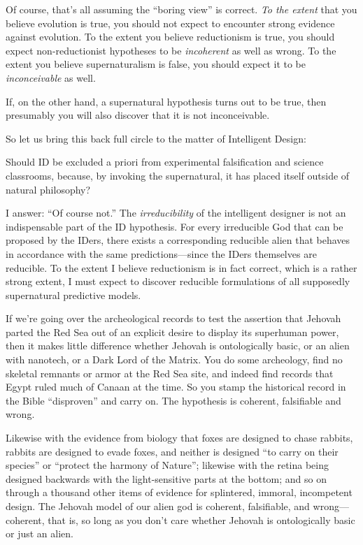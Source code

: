 {
 Of course, that's all assuming the
``boring view'' is correct.
\textit{To the extent} that you believe evolution is true, you should
not expect to encounter strong evidence against evolution. To the
extent you believe reductionism is true, you should expect
non-reductionist hypotheses to be \textit{incoherent} as well as wrong.
To the extent you believe supernaturalism is false, you should expect
it to be \textit{inconceivable} as well.}

{
 If, on the other hand, a supernatural hypothesis turns out to be
true, then presumably you will also discover that it is not
inconceivable.}

{
 So let us bring this back full circle to the matter of Intelligent
Design:}

{
 Should ID be excluded a priori from experimental falsification and
science classrooms, because, by invoking the supernatural, it has
placed itself outside of natural philosophy?}

{
 I answer: ``Of course not.''
The \textit{irreducibility} of the intelligent designer is not an
indispensable part of the ID hypothesis. For every irreducible God that
can be proposed by the IDers, there exists a corresponding reducible
alien that behaves in accordance with the same predictions---since the
IDers themselves are reducible. To the extent I believe reductionism is
in fact correct, which is a rather strong extent, I must expect to
discover reducible formulations of all supposedly supernatural
predictive models.}

{
 If we're going over the archeological records to
test the assertion that Jehovah parted the Red Sea out of an explicit
desire to display its superhuman power, then it makes little difference
whether Jehovah is ontologically basic, or an alien with nanotech, or a
Dark Lord of the Matrix. You do some archeology, find no skeletal
remnants or armor at the Red Sea site, and indeed find records that
Egypt ruled much of Canaan at the time. So you stamp the historical
record in the Bible ``disproven''
and carry on. The hypothesis is coherent, falsifiable and wrong.}

{
 Likewise with the evidence from biology that foxes are designed to
chase rabbits, rabbits are designed to evade foxes, and neither is
designed ``to carry on their
species'' or ``protect the harmony
of Nature''; likewise with the retina being designed
backwards with the light-sensitive parts at the bottom; and so on
through a thousand other items of evidence for splintered, immoral,
incompetent design. The Jehovah model of our alien god is coherent,
falsifiable, and wrong---coherent, that is, so long as you
don't care whether Jehovah is ontologically basic or
just an alien.}

